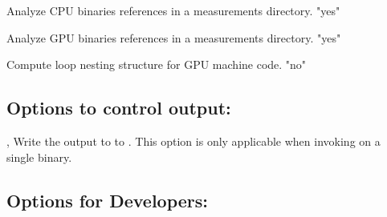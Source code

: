 \documentclass[english]{article}
\begin{document}
\begin{Description}

\item[\OptArg{--cpu}{"yes"/"no"}]
Analyze CPU binaries references in a measurements directory. {"yes"}

\item[\OptArg{--gpu}{"yes"/"no"}]
Analyze GPU binaries references in a measurements directory. {"yes"}

\item[\OptArg{--gpucfg}{"yes"/"no"}]
Compute loop nesting structure for GPU machine code. {"no"}


%

\end{Description}

\subsection{Options to control output:}
\begin{Description}

\item[\OptArg{-o}{filename}, \OptArg{--output}{filename}]
Write the output to to .  This option is only applicable when invoking
 on a single binary.

\end{Description}

\subsection{Options for Developers:}
\end{document}
